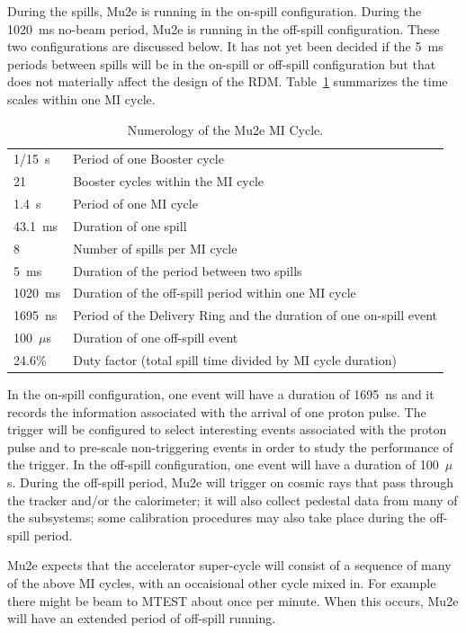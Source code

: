 During the spills, Mu2e is running in the on-spill configuration.
During the 1020~ms no-beam period, Mu2e is running in the off-spill configuration.
These two configurations are discussed below.
It has not yet been decided if the 5~ms periods between spills will
be in the on-spill or off-spill configuration
but that does not materially affect the design of the RDM.
Table~\ref{tab:timescales} summarizes the time scales within one MI cycle.
\begin{table}
\begin{center}
\caption[Numerology of the Mu2e MI Cycle]{Numerology of the Mu2e MI Cycle.}
\label{tab:timescales}
\begin{tabular}{ll}\hline
   1/15~s & Period of one Booster cycle \\
   21     & Booster cycles within the MI cycle \\
   1.4~s  & Period of one MI cycle \\
   43.1~ms & Duration of one spill \\
   8       & Number of spills per MI cycle \\
    5~ms   & Duration of the period between two spills \\
   1020~ms & Duration of the off-spill period within one MI cycle \\
   1695~ns & Period of the Delivery Ring and the duration of one on-spill event\\
   100~$\mu$s & Duration of one off-spill event \\
   24.6\%     & Duty factor (total spill time divided by MI cycle duration)\\
   \hline
  \end{tabular}
\end{center}
\end{table}


In the on-spill configuration, one event will have  a duration of 1695~ns
and it records the information associated with the arrival of one proton pulse.
The trigger will be configured to select interesting events associated with the proton pulse
and to pre-scale non-triggering events in order to study the performance of the trigger.
In the off-spill configuration, one event will have a duration of 100~$\mu$s.
During the off-spill period, Mu2e will trigger on cosmic rays that
pass through the tracker and/or the calorimeter; it will also collect
pedestal data from many of the subsystems; some calibration procedures
may also take place during the off-spill period.

Mu2e expects that the accelerator super-cycle will consist of a
sequence of many of the above MI cycles,
with an occaisional other cycle mixed in.
For example there might be beam to MTEST about once per minute.
When this occurs, Mu2e will have an extended period of off-spill running.

